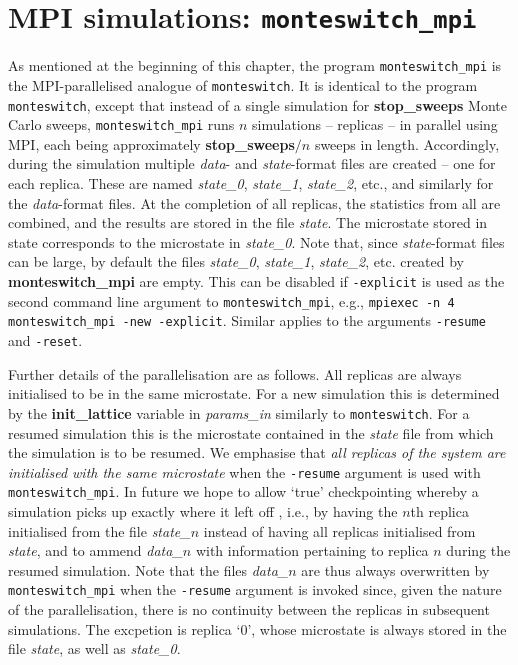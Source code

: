 \documentclass{report}
\begin{document}
\section{MPI simulations: \texttt{monteswitch\_mpi}}
As mentioned at the beginning of this chapter, the program \texttt{monteswitch\_mpi} is the MPI-parallelised analogue of \texttt{monteswitch}. 
It is identical to the program \texttt{monteswitch}, except that instead of a single simulation for \textbf{stop\_sweeps} Monte Carlo sweeps, 
\texttt{monteswitch\_mpi} runs $n$ simulations -- replicas -- in parallel using MPI, each being approximately \textbf{stop\_sweeps}$/n$ sweeps in 
length. Accordingly, during the simulation multiple \emph{data}- and \emph{state}-format files are created -- one for each replica. These 
are named \emph{state\_0}, \emph{state\_1}, \emph{state\_2}, etc., and similarly for the \emph{data}-format files. At the completion of 
all replicas, the statistics from all are combined, and the results are stored in the file \emph{state}. The microstate stored in state
corresponds to the microstate in \emph{state\_0}. 
Note that, since \emph{state}-format files can be large, by default the files \emph{state\_0}, \emph{state\_1}, 
\emph{state\_2}, etc. created by \textbf{monteswitch\_mpi} are empty. This can be disabled if \texttt{-explicit} is used as the second command line 
argument to \texttt{monteswitch\_mpi}, e.g., \texttt{mpiexec -n 4 monteswitch\_mpi -new -explicit}. Similar applies to the arguments \texttt{-resume} and 
\texttt{-reset}.

Further details of the parallelisation are as follows. All replicas are always initialised to be in the same microstate. For a new simulation this is 
determined by the \textbf{init\_lattice} variable in \emph{params\_in} similarly to \texttt{monteswitch}. For a resumed simulation this is the microstate 
contained in the \emph{state} file from which the simulation is to be resumed. We emphasise that \emph{all replicas of the system are initialised with 
the same microstate} when the \texttt{-resume} argument is used with \texttt{monteswitch\_mpi}. In future we hope to allow `true' checkpointing 
whereby a simulation picks up exactly where it left off , i.e., by having the $n$th replica initialised from the file \emph{state\_}$n$ instead of having
all replicas initialised from \emph{state}, and to ammend \emph{data\_}$n$ with information pertaining to replica $n$ during the resumed
simulation. Note that the files \emph{data\_}$n$ are thus always overwritten by \texttt{monteswitch\_mpi} when the \texttt{-resume} argument is
invoked since, given the nature of the parallelisation, there is no continuity between the replicas in subsequent simulations. The excpetion is replica `0',
whose microstate is always stored in the file \emph{state}, as well as \emph{state\_0}.
\end{document}
